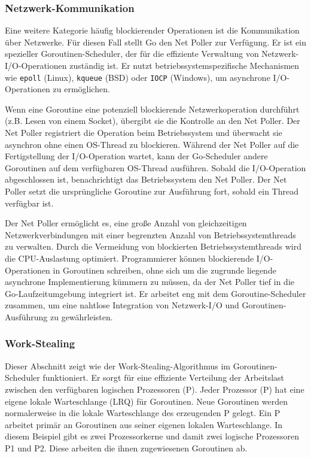 \documentclass[fontsize=12pt,paper=a4,twoside=semi,parskip=half-,headsepline,headinclude]{scrreprt}
\begin{document}
\subsubsection{Netzwerk-Kommunikation}

Eine weitere Kategorie häufig blockierender Operationen ist die Kommunikation über Netzwerke. Für diesen Fall stellt Go den Net Poller\cite{netpoll2024} zur Verfügung. Er ist ein spezieller Goroutinen-Scheduler, der für die effiziente Verwaltung von Netzwerk-I/O-Operationen zu\-stän\-dig ist. Er nutzt betriebssystemspezifische Mechanismen wie \texttt{epoll} (Linux), \texttt{kqueue} (BSD) oder \texttt{IOCP} (Windows), um asynchrone I/O-Operationen zu ermöglichen.

Wenn eine Goroutine eine potenziell blockierende Netzwerkoperation durchführt (z.B. Lesen von einem Socket), übergibt sie die Kontrolle an den Net Poller. Der Net Poller registriert die Operation beim Betriebssystem und überwacht sie asynchron ohne einen OS-Thread zu blockieren. Während der Net Poller auf die Fertigstellung der I/O-Operation wartet, kann der Go-Scheduler andere Goroutinen auf dem verfügbaren OS-Thread ausführen. Sobald die I/O-Operation abgeschlossen ist, benachrichtigt das Betriebssystem den Net Poller. Der Net Poller setzt die ursprüngliche Goroutine zur Ausführung fort, sobald ein Thread verfügbar ist.

Der Net Poller ermöglicht es, eine große Anzahl von gleichzeitigen Netzwerkverbindungen mit einer begrenzten Anzahl von Betriebssystemthreads zu verwalten. Durch die Vermeidung von blockierten Betriebssystemthreads wird die CPU-Auslastung optimiert. Programmierer können blockierende I/O-Operationen in Goroutinen schreiben, ohne sich um die zugrunde liegende asynchrone Implementierung kümmern zu müssen, da der Net Poller tief in die Go-Laufzeitumgebung integriert ist. Er arbeitet eng mit dem Goroutine-Scheduler zusammen, um eine nahtlose Integration von Netzwerk-I/O und Goroutinen-Ausführung zu gewährleisten. 

\subsubsection{Work-Stealing}
\label{subsubsec:workstealing}

Dieser Abschnitt zeigt wie der Work-Stealing-Algorithmus im Goroutinen-Scheduler funktioniert. Er sorgt für eine effiziente Verteilung der Arbeitslast zwischen den verfügbaren logischen Prozessoren (P). Jeder Prozessor (P) hat eine eigene lokale Warteschlange (LRQ) für Goroutinen. Neue Goroutinen werden normalerweise in die lokale Warteschlange des erzeugenden P gelegt. Ein P arbeitet primär an Goroutinen aus seiner eigenen lokalen Warteschlange. In diesem Beispiel gibt es zwei Prozessorkerne und damit zwei logische Prozessoren P1 und P2. Diese arbeiten die ihnen zugewiesenen Goroutinen ab.
\end{document}
